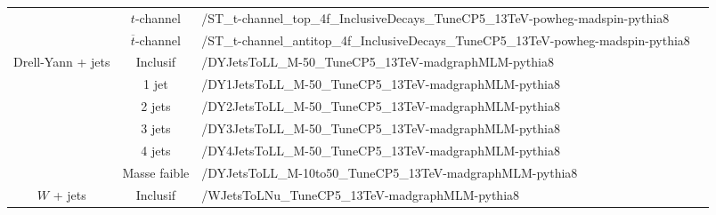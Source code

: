 \begin{table}[]
{{\begin{tabular}{|cclc|}
\multicolumn{1}{|c|}{}                                            & \multicolumn{1}{c|}{$t$-channel}            & \multicolumn{1}{l|}{/ST\_t-channel\_top\_4f\_InclusiveDecays\_TuneCP5\_13TeV-powheg-madspin-pythia8}     &                       \\ \cline{2-4} 
\multicolumn{1}{|c|}{}                                            & \multicolumn{1}{c|}{$\overline{t}$-channel} & \multicolumn{1}{l|}{/ST\_t-channel\_antitop\_4f\_InclusiveDecays\_TuneCP5\_13TeV-powheg-madspin-pythia8} &                       \\ \hline
\multicolumn{1}{|c|}{\multirow{6}{*}{Drell-Yann + jets}}          & \multicolumn{1}{c|}{Inclusif}               & \multicolumn{1}{l|}{/DYJetsToLL\_M-50\_TuneCP5\_13TeV-madgraphMLM-pythia8}                               &                       \\ \cline{2-4} 
\multicolumn{1}{|c|}{}                                            & \multicolumn{1}{c|}{1 jet}                  & \multicolumn{1}{l|}{/DY1JetsToLL\_M-50\_TuneCP5\_13TeV-madgraphMLM-pythia8}                              &                       \\ \cline{2-4} 
\multicolumn{1}{|c|}{}                                            & \multicolumn{1}{c|}{2 jets}                 & \multicolumn{1}{l|}{/DY2JetsToLL\_M-50\_TuneCP5\_13TeV-madgraphMLM-pythia8}                              &                       \\ \cline{2-4} 
\multicolumn{1}{|c|}{}                                            & \multicolumn{1}{c|}{3 jets}                 & \multicolumn{1}{l|}{/DY3JetsToLL\_M-50\_TuneCP5\_13TeV-madgraphMLM-pythia8}                              &                       \\ \cline{2-4} 
\multicolumn{1}{|c|}{}                                            & \multicolumn{1}{c|}{4 jets}                 & \multicolumn{1}{l|}{/DY4JetsToLL\_M-50\_TuneCP5\_13TeV-madgraphMLM-pythia8}                              &                       \\ \cline{2-4} 
\multicolumn{1}{|c|}{}                                            & \multicolumn{1}{c|}{Masse faible}           & \multicolumn{1}{l|}{/DYJetsToLL\_M-10to50\_TuneCP5\_13TeV-madgraphMLM-pythia8}                           &                       \\ \hline
\multicolumn{1}{|c|}{\multirow{5}{*}{$W$ + jets}}                 & \multicolumn{1}{c|}{Inclusif}               & \multicolumn{1}{l|}{/WJetsToLNu\_TuneCP5\_13TeV-madgraphMLM-pythia8}                                     &                       \\ \cline{2-4} 

\end{tabular}}}
\end{table}
